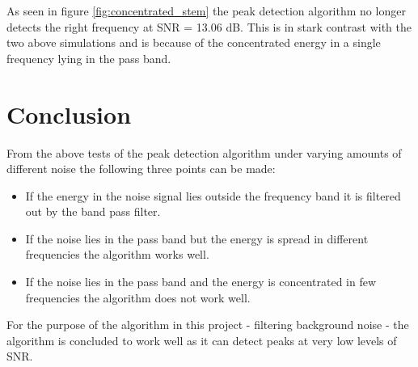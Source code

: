 As seen in figure \ref{fig:concentrated_stem} the peak detection algorithm no longer detects the right frequency at SNR = 13.06 dB. This is in stark contrast with the two above simulations and is because of the concentrated energy in a single frequency lying in the pass band.
\section{Conclusion}
From the above tests of the peak detection algorithm under varying amounts of different noise the following three points can be made:
\begin{itemize}
\item If the energy in the noise signal lies outside the frequency band it is filtered out by the band pass filter.
\item If the noise lies in the pass band but the energy is spread in different frequencies the algorithm works well.
\item If the noise lies in the pass band and the energy is concentrated in few frequencies the algorithm does not work well.
\end{itemize}
For the purpose of the algorithm in this project - filtering background noise - the algorithm is concluded to work well as it can detect peaks at very low levels of SNR.

